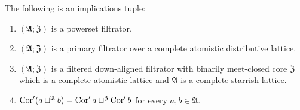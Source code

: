 \begin{thm}
\label{dual-core-join}The following is an implications tuple:
\begin{enumerate}
\item \label{dual-core-join-p}$(\mathfrak{A};\mathfrak{Z})$ is a powerset
filtrator.
\item \label{dual-core-join-f}$(\mathfrak{A};\mathfrak{Z})$ is a primary
filtrator over a complete atomistic distributive lattice.
\item \label{dual-core-join-fltr}$(\mathfrak{A};\mathfrak{Z})$ is a filtered
down-aligned filtrator with binarily meet-closed core $\mathfrak{Z}$
which is a complete atomistic lattice and $\mathfrak{A}$ is a complete
starrish lattice.
\item \label{dual-core-join-conc}$\operatorname{Cor}'(a\sqcup^{\mathfrak{A}}b)=\operatorname{Cor}'a\sqcup^{\mathfrak{Z}}\operatorname{Cor}'b$
for every $a,b\in\mathfrak{A}$.
\end{enumerate}
\end{thm}
